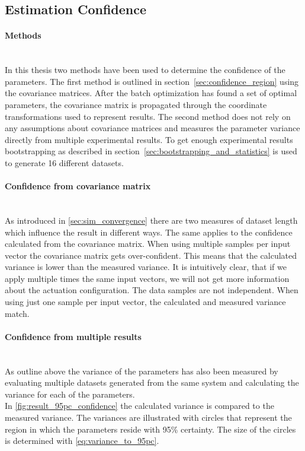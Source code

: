 \subsection{Estimation Confidence}
\paragraph{Methods} ~\\
In this thesis two methods have been used to determine  the confidence of the parameters.
The first method is outlined in section~\ref{sec:confidence_region} using the covariance matrices.
After the batch optimization has found a set of optimal parameters, the covariance matrix is propagated through the coordinate transformations used to represent results.
The second method does not rely on any assumptions about covariance matrices and measures the parameter variance directly from multiple experimental results.
To get enough experimental results bootstrapping as described in section~\ref{sec:bootstrapping_and_statistics} is used to generate 16 different datasets.

\paragraph{Confidence from covariance matrix} ~\\
As introduced in \cref{sec:sim_convergence} there are two measures of dataset length which influence the result in different ways.
The same applies to the confidence calculated from the covariance matrix.
When using multiple samples per input vector the covariance matrix gets over-confident.
This means that the calculated variance is lower than the measured variance.
It is intuitively clear, that if we apply multiple times the same input vectors, we will not get more information about the actuation configuration.
The data samples are not independent.
When using just one sample per input vector, the calculated and measured variance match.

\paragraph{Confidence from multiple results} ~\\
As outline above the variance of the parameters has also been measured by evaluating multiple datasets generated from the same system and calculating the variance for each of the parameters.\\

In \cref{fig:result_95pc_confidence} the calculated variance is compared to the measured variance.
The variances are illustrated with circles that represent the region in which the parameters reside with 95\% certainty.
The size of the circles is determined with \cref{eq:variance_to_95pc}.

